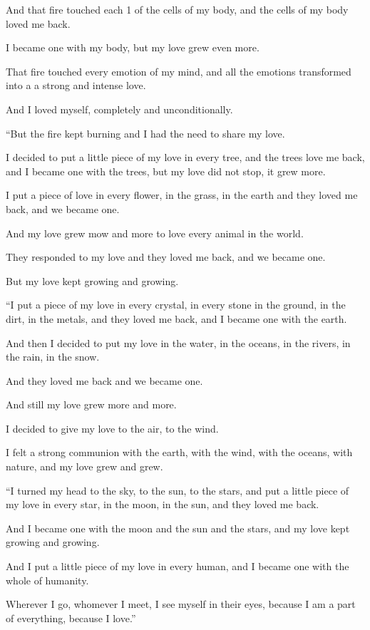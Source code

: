 \documentclass{article}
\numberwithin{equation}{section}
\begin{document}
And that fire touched each 1 of the cells of my body, and the cells of my body loved me back.

I became one with my body, but my love grew even more.

That fire touched every emotion of my mind, and all the emotions transformed into a a strong and intense love.

And I loved myself, completely and unconditionally.

%
``But the fire kept burning and I had the need to share my love.

I decided to put a little piece of my love in every tree, and the trees love me back, and I became one with the trees, but my love did not stop, it grew more.

I put a piece of love in every flower, in the grass, in the earth and they loved me back, and we became one.

And my love grew mow and more to love every animal in the world.

They responded to my love and they loved me back, and we became one.

But my love kept growing and growing.

%
``I put a piece of my love in every crystal, in every stone in the ground, in the dirt, in the metals, and they loved me back, and I became one with the earth.

And then I decided to put my love in the water, in the oceans, in the rivers, in the rain, in the snow.

And they loved me back and we became one.

And still my love grew more and more.

I decided to give my love to the air, to the wind.

I felt a strong communion with the earth, with the wind, with the oceans, with nature, and my love grew and grew.

%
``I turned my head to the sky, to the sun, to the stars, and put a little piece of my love in every star, in the moon, in the sun, and they loved me back.

And I became one with the moon and the sun and the stars, and my love kept growing and growing.

And I put a little piece of my love in every human, and I became one with the whole of humanity.

Wherever I go, whomever I meet, I see myself in their eyes, because I am a part of everything, because I love.''
\end{document}
